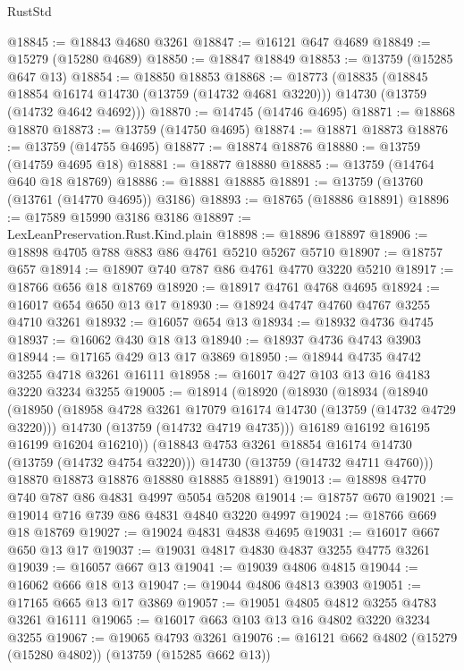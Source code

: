\begin{lexlean}{RustStd}
\begin{coremodule}
@18845 := @18843 @4680 @3261
@18847 := @16121 @647 @4689
@18849 := @15279 (@15280 @4689)
@18850 := @18847 @18849
@18853 := @13759 (@15285 @647 @13)
@18854 := @18850 @18853
@18868 := @18773
    (@18835
      (@18845 @18854 @16174 @14730 (@13759 (@14732 @4681 @3220)))
      @14730
      (@13759 (@14732 @4642 @4692)))
@18870 := @14745 (@14746 @4695)
@18871 := @18868 @18870
@18873 := @13759 (@14750 @4695)
@18874 := @18871 @18873
@18876 := @13759 (@14755 @4695)
@18877 := @18874 @18876
@18880 := @13759 (@14759 @4695 @18)
@18881 := @18877 @18880
@18885 := @13759 (@14764 @640 @18 @18769)
@18886 := @18881 @18885
@18891 := @13759 (@13760 (@13761 (@14770 @4695)) @3186)
@18893 := @18765 (@18886 @18891)
@18896 := @17589 @15990 @3186 @3186
@18897 := LexLeanPreservation.Rust.Kind.plain
@18898 := @18896 @18897
@18906 := @18898 @4705 @788 @883 @86 @4761 @5210 @5267 @5710
@18907 := @18757 @657
@18914 := @18907 @740 @787 @86 @4761 @4770 @3220 @5210
@18917 := @18766 @656 @18 @18769
@18920 := @18917 @4761 @4768 @4695
@18924 := @16017 @654 @650 @13 @17
@18930 := @18924 @4747 @4760 @4767 @3255 @4710 @3261
@18932 := @16057 @654 @13
@18934 := @18932 @4736 @4745
@18937 := @16062 @430 @18 @13
@18940 := @18937 @4736 @4743 @3903
@18944 := @17165 @429 @13 @17 @3869
@18950 := @18944 @4735 @4742 @3255 @4718 @3261 @16111
@18958 := @16017 @427 @103 @13 @16 @4183 @3220 @3234 @3255
@19005 := @18914
    (@18920
      (@18930
        (@18934
          (@18940
            (@18950
              (@18958 @4728 @3261 @17079 @16174 @14730 (@13759 (@14732 @4729 @3220)))
              @14730
              (@13759 (@14732 @4719 @4735)))
            @16189
            @16192
            @16195
            @16199
            @16204
            @16210))
        (@18843 @4753 @3261 @18854 @16174 @14730 (@13759 (@14732 @4754 @3220)))
        @14730
        (@13759 (@14732 @4711 @4760)))
      @18870
      @18873
      @18876
      @18880
      @18885
      @18891)
@19013 := @18898 @4770 @740 @787 @86 @4831 @4997 @5054 @5208
@19014 := @18757 @670
@19021 := @19014 @716 @739 @86 @4831 @4840 @3220 @4997
@19024 := @18766 @669 @18 @18769
@19027 := @19024 @4831 @4838 @4695
@19031 := @16017 @667 @650 @13 @17
@19037 := @19031 @4817 @4830 @4837 @3255 @4775 @3261
@19039 := @16057 @667 @13
@19041 := @19039 @4806 @4815
@19044 := @16062 @666 @18 @13
@19047 := @19044 @4806 @4813 @3903
@19051 := @17165 @665 @13 @17 @3869
@19057 := @19051 @4805 @4812 @3255 @4783 @3261 @16111
@19065 := @16017 @663 @103 @13 @16 @4802 @3220 @3234 @3255
@19067 := @19065 @4793 @3261
@19076 := @16121 @662 @4802 (@15279 (@15280 @4802)) (@13759 (@15285 @662 @13))

\end{coremodule}
\end{lexlean}
